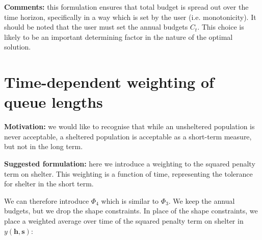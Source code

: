 \documentclass{article}
\begin{document}
\textbf{Comments:} this formulation ensures that total budget is spread out over the time horizon, specifically in a way which is set by the user (i.e. monotonicity). It should be noted that the user must set the annual budgets $C_t$. This choice is likely to be an important determining factor in the nature of the optimal solution. 

\newpage

\section{Time-dependent weighting of queue lengths}

\textbf{Motivation:} we would like to recognise that while an unsheltered population is never acceptable, a sheltered population is acceptable as a short-term measure, but not in the long term. \par 
%
\textbf{Suggested formulation:} here we introduce a weighting to the squared penalty term on shelter. This weighting is a function of time, representing the tolerance for shelter in the short term. \par
%
We can therefore introduce $\Phi_4$ which is similar to $\Phi_3$. We keep the annual budgets, but we drop the shape constraints. In place of the shape constraints, we place a weighted average over time of the squared penalty term on shelter in $y(\boldsymbol{h},\boldsymbol{s})$: 
\end{document}
